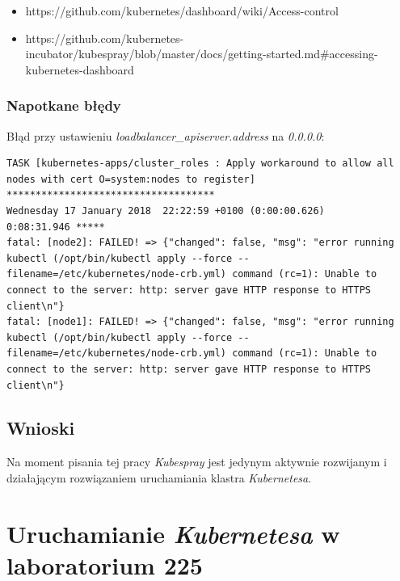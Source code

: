 \documentclass[a4paper,12pt,twoside,openany]{report}
\providecommand{\tightlist}{%
  \setlength{\itemsep}{0pt}\setlength{\parskip}{0pt}}
\begin{document}
\begin{itemize}
\tightlist
\item
  https://github.com/kubernetes/dashboard/wiki/Access-control
\item
  https://github.com/kubernetes-incubator/kubespray/blob/master/docs/getting-started.md\#accessing-kubernetes-dashboard
\end{itemize}

\hypertarget{napotkane-bux142ux119dy-1}{%
\subsection{Napotkane błędy}\label{napotkane-bux142ux119dy-1}}

Błąd przy ustawieniu \emph{loadbalancer\_apiserver.address} na
\emph{0.0.0.0}:

\begin{lstlisting}
TASK [kubernetes-apps/cluster_roles : Apply workaround to allow all nodes with cert O=system:nodes to register] ************************************
Wednesday 17 January 2018  22:22:59 +0100 (0:00:00.626)       0:08:31.946 *****
fatal: [node2]: FAILED! => {"changed": false, "msg": "error running kubectl (/opt/bin/kubectl apply --force --filename=/etc/kubernetes/node-crb.yml) command (rc=1): Unable to connect to the server: http: server gave HTTP response to HTTPS client\n"}
fatal: [node1]: FAILED! => {"changed": false, "msg": "error running kubectl (/opt/bin/kubectl apply --force --filename=/etc/kubernetes/node-crb.yml) command (rc=1): Unable to connect to the server: http: server gave HTTP response to HTTPS client\n"}
\end{lstlisting}

\hypertarget{wnioski-4}{%
\section{Wnioski}\label{wnioski-4}}

Na moment pisania tej pracy \emph{Kubespray} jest jedynym aktywnie
rozwijanym i działającym rozwiązaniem uruchamiania klastra
\emph{Kubernetesa}.

\hypertarget{uruchamianie-kubernetesa-w-laboratorium-225}{%
\chapter{\texorpdfstring{Uruchamianie \emph{Kubernetesa} w laboratorium
225}{Uruchamianie Kubernetesa w laboratorium 225}}\label{uruchamianie-kubernetesa-w-laboratorium-225}}
\end{document}
